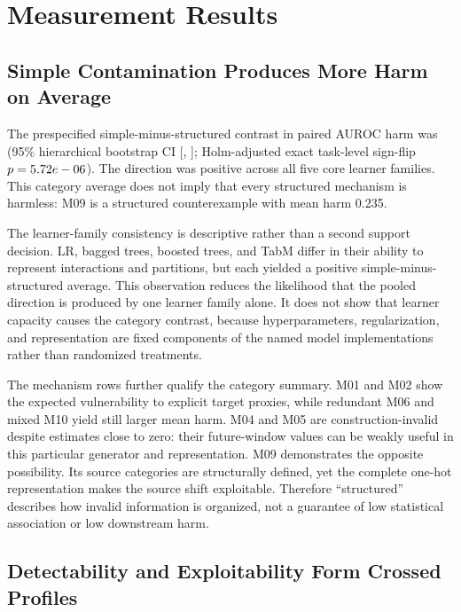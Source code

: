 \documentclass[sigconf,review]{acmart}
\begin{document}
\section{Measurement Results}

\subsection{Simple Contamination Produces More Harm on Average}

The prespecified simple-minus-structured contrast in paired AUROC harm was
\CoreContrast{} (95\% hierarchical bootstrap CI [\CoreContrastLow{},
\CoreContrastHigh{}]; Holm-adjusted exact task-level sign-flip
$p=5.72e-06{}$). The direction was positive across all five core learner
families. This category average does not imply that every structured mechanism
is harmless: M09 is a structured counterexample with mean harm 0.235.

The learner-family consistency is descriptive rather than a second support
decision. LR, bagged trees, boosted trees, and TabM differ in their ability to
represent interactions and partitions, but each yielded a positive
simple-minus-structured average. This observation reduces the likelihood that
the pooled direction is produced by one learner family alone. It does not show
that learner capacity causes the category contrast, because hyperparameters,
regularization, and representation are fixed components of the named model
implementations rather than randomized treatments.



The mechanism rows further qualify the category summary. M01 and M02 show the
expected vulnerability to explicit target proxies, while redundant M06 and
mixed M10 yield still larger mean harm. M04 and M05 are construction-invalid
despite estimates close to zero: their future-window values can be weakly
useful in this particular generator and representation. M09 demonstrates the
opposite possibility. Its source categories are structurally defined, yet the
complete one-hot representation makes the source shift exploitable. Therefore
``structured'' describes how invalid information is organized, not a guarantee
of low statistical association or low downstream harm.

\subsection{Detectability and Exploitability Form Crossed Profiles}
\end{document}
